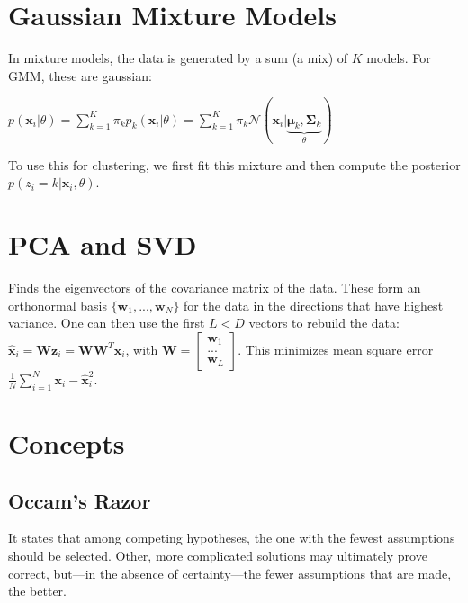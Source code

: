 \documentclass[10pt,a4paper,landscape]{article}
\providecommand{\bf}[1]{\ensuremath{\mathbf{#1}}}
\begin{document}
\begin{multicols*}{4}
\section{Gaussian Mixture Models}
In mixture models, the data is generated by a sum (a mix) of $K$ models. For GMM, these are gaussian:

$p(\bf{x}_i | \theta) = \sum_{k=1}^K \pi_k p_k(\bf{x}_i | \theta) =  \sum_{k=1}^K \pi_k \mathcal{N}(\bf{x}_i | \underbrace{\bf{\mu}_k, \bf{\Sigma}_k}_{\theta})$

To use this for clustering, we first fit this mixture and then compute the posterior $p(z_i = k | \bf{x}_i, \theta)$.

\section{PCA and SVD}
Finds the eigenvectors of the covariance matrix of the data. These form an orthonormal basis $\{ \bf{w}_1, ..., \bf{w}_N\}$ for the data in the directions that have highest variance.
One can then use the first $L < D$ vectors to rebuild the data: $\bf{\hat{x}}_i = \bf{W} \bf{z}_i = \bf{W} \bf{W}^T \bf{x}_i$, with $\bf{W} = \begin{bmatrix} \bf{w}_1 \\ ... \\ \bf{w}_L \end{bmatrix}$.
This minimizes mean square error $\frac{1}{N} \sum_{i=1}^N \bf{x}_i - \bf{\hat{x}}_i^2$.

\section{Concepts}
\subsection{Occam's Razor}
It states that among competing hypotheses, the one with the fewest assumptions should be selected. Other, more complicated solutions may ultimately prove correct, but—in the absence of certainty—the fewer assumptions that are made, the better.


\end{multicols*}
\end{document}
